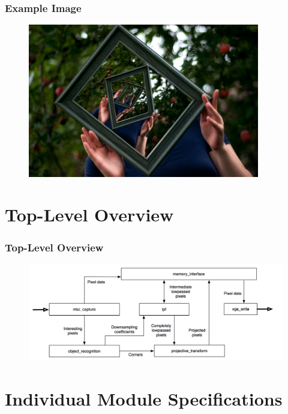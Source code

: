 \documentclass{beamer}
\begin{document}
\begin{frame}
	\frametitle{Example Image}
	\begin{figure}
		\centering
		\includegraphics[width=0.9\textwidth]{images/example/example3.jpg}
	\end{figure}
\end{frame}

\section{Top-Level Overview}
\begin{frame}
	\frametitle{Top-Level Overview}
	\begin{figure}
		\centering
		\includegraphics[width=\textwidth]{../proposal/simplified_block_diagram.png}
	\end{figure}
\end{frame}

\section{Individual Module Specifications}
\end{document}
